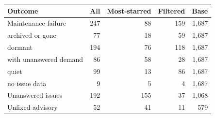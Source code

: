 \begin{tabular}{lrrrr}
\toprule
Outcome & All & Most-starred & Filtered & Base \\
\midrule
Maintenance failure & 247 & 88 & 159 & 1{,}687 \\
\quad archived or gone & 77 & 18 & 59 & 1{,}687 \\
\quad dormant & 194 & 76 & 118 & 1{,}687 \\
\qquad with unanswered demand & 86 & 58 & 28 & 1{,}687 \\
\qquad quiet & 99 & 13 & 86 & 1{,}687 \\
\qquad no issue data & 9 & 5 & 4 & 1{,}687 \\
Unanswered issues & 192 & 155 & 37 & 1{,}068 \\
Unfixed advisory & 52 & 41 & 11 & 579 \\
\bottomrule
\end{tabular}
